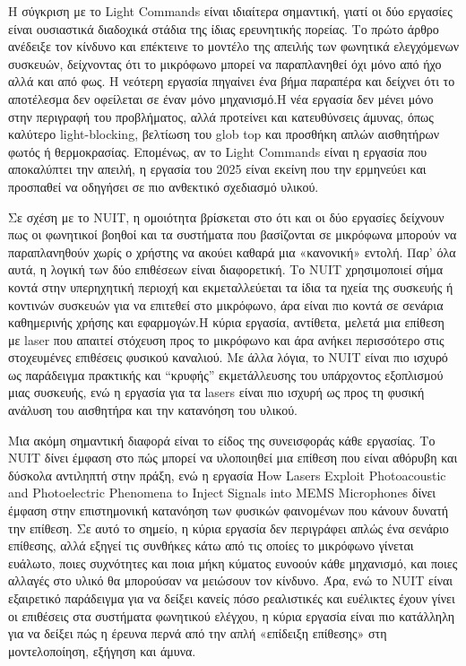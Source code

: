 \documentclass[12pt,a4paper]{report}
\begin{document}
	Η σύγκριση με το Light Commands είναι ιδιαίτερα σημαντική, γιατί οι δύο εργασίες είναι ουσιαστικά διαδοχικά στάδια της ίδιας ερευνητικής πορείας. Το πρώτο άρθρο ανέδειξε τον κίνδυνο και επέκτεινε το μοντέλο της απειλής των φωνητικά ελεγχόμενων συσκευών, δείχνοντας ότι το μικρόφωνο μπορεί να παραπλανηθεί όχι μόνο από ήχο αλλά και από φως. Η νεότερη εργασία πηγαίνει ένα βήμα παραπέρα και δείχνει ότι το αποτέλεσμα δεν οφείλεται σε έναν μόνο μηχανισμό.Η νέα εργασία δεν μένει μόνο στην περιγραφή του προβλήματος, αλλά προτείνει και κατευθύνσεις άμυνας, όπως καλύτερο light-blocking, βελτίωση του glob top και προσθήκη απλών αισθητήρων φωτός ή θερμοκρασίας. Επομένως, αν το Light Commands είναι η εργασία που αποκαλύπτει την απειλή, η εργασία του 2025 είναι εκείνη που την ερμηνεύει και προσπαθεί να οδηγήσει σε πιο ανθεκτικό σχεδιασμό υλικού.
	
	Σε σχέση με το NUIT, η ομοιότητα βρίσκεται στο ότι και οι δύο εργασίες δείχνουν πως οι φωνητικοί βοηθοί και τα συστήματα που βασίζονται σε μικρόφωνα μπορούν να παραπλανηθούν χωρίς ο χρήστης να ακούει καθαρά μια «κανονική» εντολή. Παρ’ όλα αυτά, η λογική των δύο επιθέσεων είναι διαφορετική. Το NUIT χρησιμοποιεί σήμα κοντά στην υπερηχητική περιοχή και εκμεταλλεύεται τα ίδια τα ηχεία της συσκευής ή κοντινών συσκευών για να επιτεθεί στο μικρόφωνο, άρα είναι πιο κοντά σε σενάρια καθημερινής χρήσης και εφαρμογών.Η κύρια εργασία, αντίθετα, μελετά μια επίθεση με laser που απαιτεί στόχευση προς το μικρόφωνο και άρα ανήκει περισσότερο στις στοχευμένες επιθέσεις φυσικού καναλιού. Με άλλα λόγια, το NUIT είναι πιο ισχυρό ως παράδειγμα πρακτικής και “κρυφής” εκμετάλλευσης του υπάρχοντος εξοπλισμού μιας συσκευής, ενώ η εργασία για τα lasers είναι πιο ισχυρή ως προς τη φυσική ανάλυση του αισθητήρα και την κατανόηση του υλικού.
	
	Μια ακόμη σημαντική διαφορά είναι το είδος της συνεισφοράς κάθε εργασίας. Το NUIT δίνει έμφαση στο πώς μπορεί να υλοποιηθεί μια επίθεση που είναι αθόρυβη και δύσκολα αντιληπτή στην πράξη, ενώ η εργασία How Lasers Exploit Photoacoustic and Photoelectric Phenomena to Inject Signals into MEMS Microphones δίνει έμφαση στην επιστημονική κατανόηση των φυσικών φαινομένων που κάνουν δυνατή την επίθεση. Σε αυτό το σημείο, η κύρια εργασία δεν περιγράφει απλώς ένα σενάριο επίθεσης, αλλά εξηγεί τις συνθήκες κάτω από τις οποίες το μικρόφωνο γίνεται ευάλωτο, ποιες συχνότητες και ποια μήκη κύματος ευνοούν κάθε μηχανισμό, και ποιες αλλαγές στο υλικό θα μπορούσαν να μειώσουν τον κίνδυνο. Άρα, ενώ το NUIT είναι εξαιρετικό παράδειγμα για να δείξει κανείς πόσο ρεαλιστικές και ευέλικτες έχουν γίνει οι επιθέσεις στα συστήματα φωνητικού ελέγχου, η κύρια εργασία είναι πιο κατάλληλη για να δείξει πώς η έρευνα περνά από την απλή «επίδειξη επίθεσης» στη μοντελοποίηση, εξήγηση και άμυνα.
	
\end{document}
